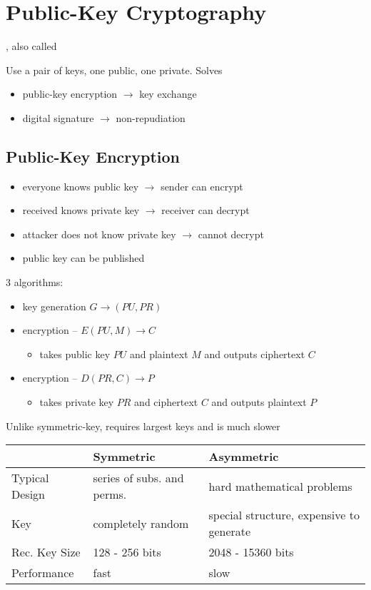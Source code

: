 \documentclass[draft]{article}
\begin{document}
\section{Public-Key Cryptography}
, also called 

Use a pair of keys, one public, one private. Solves
\begin{itemize}[nosep]
    \item public-key encryption $\rightarrow$ key exchange
    \item digital signature $\rightarrow$ non-repudiation
\end{itemize}
\subsection{Public-Key Encryption}
\begin{itemize}[nosep]
    \item everyone knows public key $\rightarrow$ sender can encrypt
    \item received knows private key $\rightarrow$ receiver can decrypt
    \item attacker does not know private key $\rightarrow$ cannot decrypt
    \item public key can be published
\end{itemize}
3 algorithms:
\begin{itemize}[nosep]
    \item key generation $G \rightarrow (PU, PR)$
    \item encryption -- $E(PU, M) \rightarrow C$
          \begin{itemize}[nosep]\item takes public key $PU$ and plaintext $M$ and outputs ciphertext $C$\end{itemize}
    \item encryption -- $D(PR, C) \rightarrow P$
          \begin{itemize}[nosep]\item takes private key $PR$ and ciphertext $C$ and outputs plaintext $P$\end{itemize}
\end{itemize}
Unlike symmetric-key, requires largest keys and is much slower

\begin{tabular}{lll}
                   & Symmetric                  & Asymmetric                               \\\toprule
    Typical Design & series of subs. and perms. & hard mathematical problems               \\
    Key            & completely random          & special structure, expensive to generate \\
    Rec. Key Size  & 128 - 256 bits             & 2048 - 15360 bits                        \\
    Performance    & fast                       & slow                                     \\\bottomrule
\end{tabular}
\end{document}

